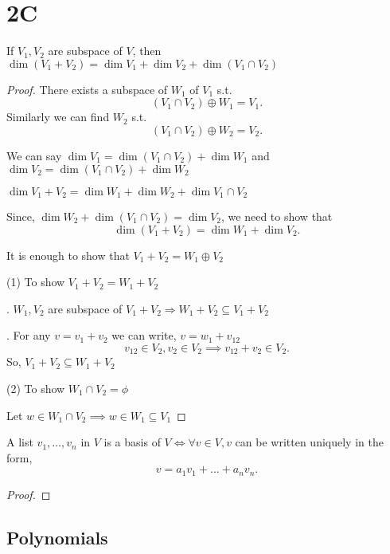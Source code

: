 \chapter*{2C}
\begin{theorem}
    If $V_1,V_2$ are subspace of $V$, then  $\dim(V_1+V_2) = \dim V_1 + \dim V_2 + \dim(V_1 \cap V_2)$
\end{theorem}
\begin{proof}
    There exists a subspace of $W_1$ of $V_1$ s.t. \[
        (V_1\cap V_2) \oplus W_1 = V_1
    .\] 
    Similarly we can find $W_2$ s.t. \[
        (V_1\cap V_2) \oplus W_2 = V_2
    .\] 

    We can say $\dim V_1 = \dim (V_1\cap V_2) + \dim W_1$ and $\dim V_2 = \dim (V_1\cap V_2) + \dim W_2$ 

    $\dim V_1 + V_2 = \dim W_1 + \dim W_2 + \dim V_1 \cap V_2$

    Since, $\dim W_2 + \dim (V_1 \cap V_2) = \dim V_2$, we need to show that \[
    \dim(V_1 + V_2) = \dim W_1 + \dim V_2
    .\] 

    It is enough to show that $V_1 + V_2 = W_1 \oplus V_2$

    (1) To show $V_1 + V_2 = W_1 + V_2$ 

    . $W_1 ,V_2$ are subspace of $V_1 + V_2 \Rightarrow W_1 + V_2 \subseteq V_1 + V_2$

    . For any $v = v_1 + v_2$ we can write, $v = w_1 + v_{12}$
     \[
     v_{12} \in V_2, v_2 \in V_2 \implies v_{12} + v_2 \in V_2 
     .\] 
     So, $V_1 + V_2 \subseteq W_1 + V_2$

     (2) To show $W_1 \cap V_2 = \phi$ 

     Let $w \in W_1 \cap V_2 \implies w \in W_1 \subseteq V_1 $
    
\end{proof}

\begin{theorem}
    A list $v_1, \dots, v_n$ in $V$ is a basis of  $V \iff \forall v \in V, v$ can be written uniquely in the form, \[
    v = a_1v_1 + \dots + a_nv_n
    .\] 
\end{theorem}
\begin{proof}
    
\end{proof}


\section*{Polynomials}

